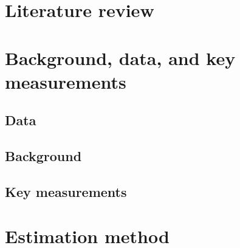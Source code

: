 \documentclass[a4paper,11pt]{article}
\begin{document}
\section{Literature review}\label{lit}

\section{Background, data, and key measurements}\label{bgdata}

\subsection{Data}\label{data}

\subsection{Background}\label{bg}

\subsection{Key measurements}\label{measure}

\newpage

\begin{landscape}
	
\end{landscape}

\newpage


\section{Estimation method}\label{method}
\end{document}
